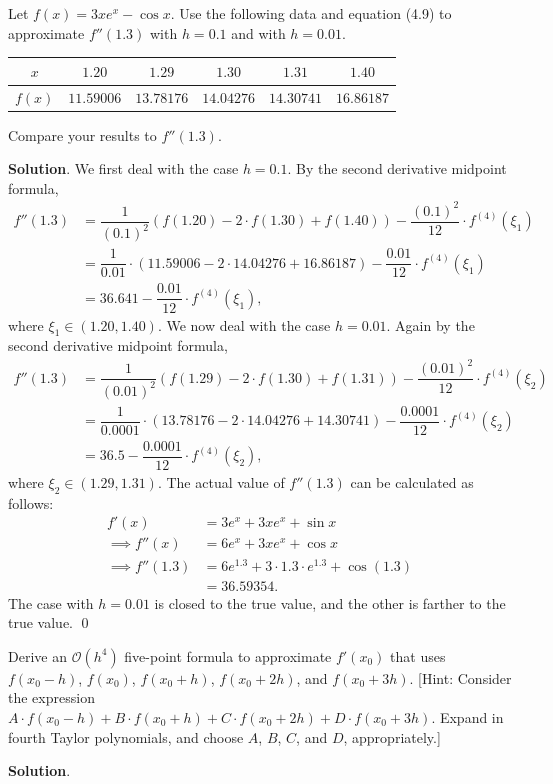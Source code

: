 \documentclass[11pt]{article}
\theoremstyle{break}
\numberwithin{equation}{theorem}
\begin{document}
\newpage
\begin{problem}\label{problem 2} %
    Let $f(x)=3xe^x-\cos x$. Use the following data and equation (4.9) to approximate $f''(1.3)$ with $h=0.1$ and with $h=0.01$.
    \begin{center}
        \begin{tabular}{c|c|c|c|c|c}
            $x$ & $1.20$ & $1.29$ & $1.30$ & $1.31$ & $1.40$ \\
            \hline
            $f(x)$ & $11.59006$ & $13.78176$ & $14.04276$ & $14.30741$ & $16.86187$
        \end{tabular}
    \end{center}
    Compare your results to $f''(1.3)$.
\end{problem}
\textbf{Solution}. We first deal with the case $h=0.1$. By the second derivative midpoint formula, \begin{align*}
    f''(1.3)&=\dfrac{1}{(0.1)^2}\left(f(1.20)-2\cdot f(1.30)+f(1.40)\right)-\dfrac{(0.1)^2}{12}\cdot f^{(4)}(\xi_1)\\
    &=\dfrac{1}{0.01}\cdot\left(11.59006-2\cdot14.04276+16.86187\right)-\dfrac{0.01}{12}\cdot f^{(4)}(\xi_1)\\
    &=36.641-\dfrac{0.01}{12}\cdot f^{(4)}(\xi_1),
\end{align*}
where $\xi_1\in(1.20, 1.40)$. We now deal with the case $h=0.01$. Again by the second derivative midpoint formula, \begin{align*}
    f''(1.3)&=\dfrac{1}{(0.01)^2}\left(f(1.29)-2\cdot f(1.30)+f(1.31)\right)-\dfrac{(0.01)^2}{12}\cdot f^{(4)}(\xi_2)\\
    &=\dfrac{1}{0.0001}\cdot\left(13.78176-2\cdot14.04276+14.30741\right)-\dfrac{0.0001}{12}\cdot f^{(4)}(\xi_2)\\
    &=36.5-\dfrac{0.0001}{12}\cdot f^{(4)}(\xi_2),
\end{align*}
where $\xi_2\in(1.29, 1.31)$. The actual value of $f''(1.3)$ can be calculated as follows:
\begin{align*}
    f'(x)&=3e^x+3xe^x+\sin x\\
    \implies f''(x)&=6e^x+3xe^x+\cos x\\
    \implies f''(1.3)&=6e^{1.3}+3\cdot1.3\cdot e^{1.3}+\cos(1.3)\\
    &=36.59354.
\end{align*}
The case with $h=0.01$ is closed to the true value, and the other is farther to the true value. \qed


\newpage
\begin{problem}\label{problem 3} %
    Derive an $\mathcal{O}(h^4)$ five-point formula to approximate $f'(x_0)$ that uses $f(x_0-h)$, $f(x_0)$, $f(x_0+h)$, $f(x_0+2h)$, and $f(x_0+3h)$. [Hint: Consider the expression $A\cdot f(x_0-h)+B\cdot f(x_0+h)+C\cdot f(x_0+2h) + D\cdot f(x_0+3h)$. Expand in fourth Taylor polynomials, and choose $A$, $B$, $C$, and $D$, appropriately.]
\end{problem}
\textbf{Solution}. 
\end{document}
